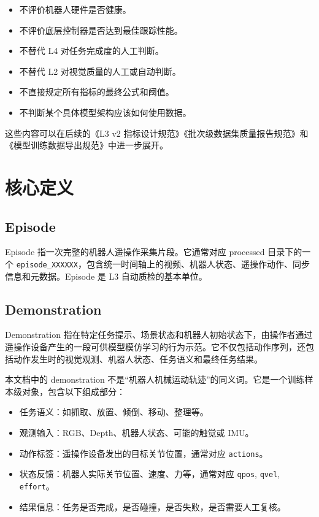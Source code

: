 \documentclass[UTF8,zihao=-4,oneside,openany]{ctexrep}
\begin{document}
\begin{itemize}
  \item 不评价机器人硬件是否健康。
  \item 不评价底层控制器是否达到最佳跟踪性能。
  \item 不替代 L4 对任务完成度的人工判断。
  \item 不替代 L2 对视觉质量的人工或自动判断。
  \item 不直接规定所有指标的最终公式和阈值。
  \item 不判断某个具体模型架构应该如何使用数据。
\end{itemize}

这些内容可以在后续的《L3 v2 指标设计规范》《批次级数据集质量报告规范》和《模型训练数据导出规范》中进一步展开。

\section{核心定义}

\subsection{Episode}

Episode 指一次完整的机器人遥操作采集片段。它通常对应 processed 目录下的一个 \texttt{episode\_XXXXXX}，包含统一时间轴上的视频、机器人状态、遥操作动作、同步信息和元数据。Episode 是 L3 自动质检的基本单位。

\subsection{Demonstration}

Demonstration 指在特定任务提示、场景状态和机器人初始状态下，由操作者通过遥操作设备产生的一段可供模型模仿学习的行为示范。它不仅包括动作序列，还包括动作发生时的视觉观测、机器人状态、任务语义和最终任务结果。

本文档中的 demonstration 不是“机器人机械运动轨迹”的同义词。它是一个训练样本级对象，包含以下组成部分：

\begin{itemize}
  \item 任务语义：如抓取、放置、倾倒、移动、整理等。
  \item 观测输入：RGB、Depth、机器人状态、可能的触觉或 IMU。
  \item 动作标签：遥操作设备发出的目标关节位置，通常对应 \texttt{actions}。
  \item 状态反馈：机器人实际关节位置、速度、力等，通常对应 \texttt{qpos}, \texttt{qvel}, \texttt{effort}。
  \item 结果信息：任务是否完成，是否碰撞，是否失败，是否需要人工复核。
\end{itemize}
\end{document}
